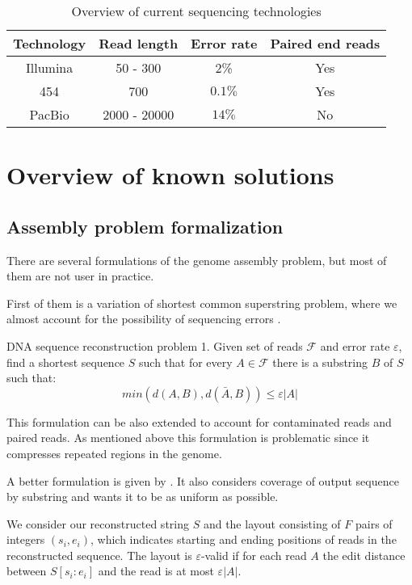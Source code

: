 \begin{table}[h]
\centering
\begin{tabular}{|c|c|c|c|}
\hline
Technology & Read length & Error rate & Paired end reads \\\hline
Illumina & 50 - 300 & 2\% & Yes\\\hline
454 & 700 & $0.1\%$ & Yes \\\hline
PacBio & 2000 - 20000 & $14\%$ & No \\\hline
\end{tabular}
\caption{Overview of current sequencing technologies}
\label{tab:techs}
\end{table}

\section{Overview of known solutions}

\subsection{Assembly problem formalization}

There are several formulations of the genome assembly problem, but
most of them are not user in practice.

First of them is a variation of shortest common superstring problem, where we
almost account for the possibility of sequencing errors \cite{kececioglu1995combinatorial}. 

\begin{definition}{DNA sequence reconstruction problem 1.}
Given set of reads $\mathcal{F}$ and error rate $\varepsilon$, find
a shortest sequence $S$ such that for every $A \in \mathcal{F}$ there is a substring
$B$ of $S$ such that:
$$min(d(A,B), d(\bar{A}, B)) \leq \varepsilon |A|$$
\end{definition}

This formulation can be also extended to account for contaminated reads and paired reads.
As mentioned above this formulation is problematic since it compresses repeated regions
in the genome.

A better formulation is given by \cite{myers1995toward}. It also considers
coverage of output sequence by substring and wants it to be as uniform as possible.

We consider our reconstructed string $S$ and the layout consisting of
$F$ pairs of integers $(s_i, e_i)$, which indicates starting and ending positions
of reads in the reconstructed sequence. The layout is $\varepsilon$-valid
if for each read $A$ the edit distance between $S[s_i:e_i]$ and the read
is at most $\varepsilon |A|$.

